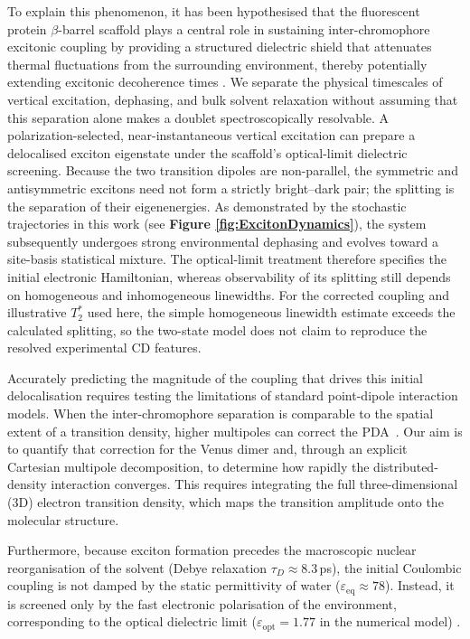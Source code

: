 \documentclass[journal=jpcbfk, manuscript=article, layout=twocolumn, doi=true]{achemso}
\begin{document}
To explain this phenomenon, it has been hypothesised that the fluorescent protein $\beta$-barrel scaffold plays a central role in sustaining inter-chromophore excitonic coupling by providing a structured dielectric shield that attenuates thermal fluctuations from the surrounding environment, thereby potentially extending excitonic decoherence times \cite{kim2019venusa206}. We separate the physical timescales of vertical excitation, dephasing, and bulk solvent relaxation without assuming that this separation alone makes a doublet spectroscopically resolvable. A polarization-selected, near-instantaneous vertical excitation can prepare a delocalised exciton eigenstate under the scaffold's optical-limit dielectric screening. Because the two transition dipoles are non-parallel, the symmetric and antisymmetric excitons need not form a strictly bright--dark pair; the splitting is the separation of their eigenenergies. As demonstrated by the stochastic trajectories in this work (see {\bf Figure \ref{fig:ExcitonDynamics}}), the system subsequently undergoes strong environmental dephasing and evolves toward a site-basis statistical mixture. The optical-limit treatment therefore specifies the initial electronic Hamiltonian, whereas observability of its splitting still depends on homogeneous and inhomogeneous linewidths. For the corrected coupling and illustrative $T_2^*$ used here, the simple homogeneous linewidth estimate exceeds the calculated splitting, so the two-state model does not claim to reproduce the resolved experimental CD features.

Accurately predicting the magnitude of the coupling that drives this initial delocalisation requires testing the limitations of standard point-dipole interaction models. When the inter-chromophore separation is comparable to the spatial extent of a transition density, higher multipoles can correct the PDA~\cite{sobakinskaya2018theory, scholes2003, kitohnishioka2017forster}. Our aim is to quantify that correction for the Venus dimer and, through an explicit Cartesian multipole decomposition, to determine how rapidly the distributed-density interaction converges. This requires integrating the full three-dimensional (3D) electron transition density, which maps the transition amplitude onto the molecular structure.

Furthermore, because exciton formation precedes the macroscopic nuclear reorganisation of the solvent (Debye relaxation $\tau_D \approx 8.3$\,ps), the initial Coulombic coupling is not damped by the static permittivity of water ($\varepsilon_{\mathrm{eq}} \approx 78$). Instead, it is screened only by the fast electronic polarisation of the environment, corresponding to the optical dielectric limit ($\varepsilon_{\mathrm{opt}} = 1.77$ in the numerical model) \cite{mennucci2012, scholes2003}.
\end{document}
